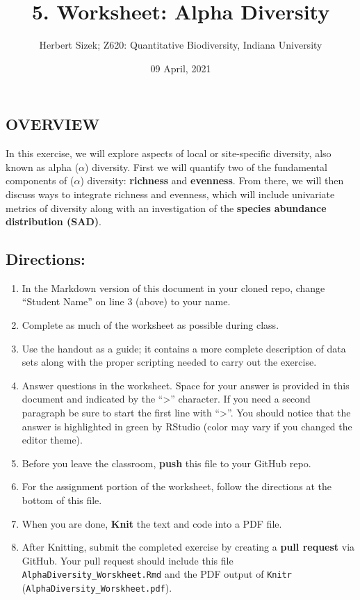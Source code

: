 \documentclass[
]{article}
\title{5. Worksheet: Alpha Diversity}
\author{Herbert Sizek; Z620: Quantitative Biodiversity, Indiana University}
\date{09 April, 2021}
\providecommand{\tightlist}{%
  \setlength{\itemsep}{0pt}\setlength{\parskip}{0pt}}
\begin{document}
\maketitle

\hypertarget{overview}{%
\subsection{OVERVIEW}\label{overview}}

In this exercise, we will explore aspects of local or site-specific
diversity, also known as alpha (\(\alpha\)) diversity. First we will
quantify two of the fundamental components of (\(\alpha\)) diversity:
\textbf{richness} and \textbf{evenness}. From there, we will then
discuss ways to integrate richness and evenness, which will include
univariate metrics of diversity along with an investigation of the
\textbf{species abundance distribution (SAD)}.

\hypertarget{directions}{%
\subsection{Directions:}\label{directions}}

\begin{enumerate}
\def\labelenumi{\arabic{enumi}.}
\tightlist
\item
  In the Markdown version of this document in your cloned repo, change
  ``Student Name'' on line 3 (above) to your name.
\item
  Complete as much of the worksheet as possible during class.
\item
  Use the handout as a guide; it contains a more complete description of
  data sets along with the proper scripting needed to carry out the
  exercise.
\item
  Answer questions in the worksheet. Space for your answer is provided
  in this document and indicated by the ``\textgreater{}'' character. If
  you need a second paragraph be sure to start the first line with
  ``\textgreater{}''. You should notice that the answer is highlighted
  in green by RStudio (color may vary if you changed the editor theme).
\item
  Before you leave the classroom, \textbf{push} this file to your GitHub
  repo.
\item
  For the assignment portion of the worksheet, follow the directions at
  the bottom of this file.
\item
  When you are done, \textbf{Knit} the text and code into a PDF file.
\item
  After Knitting, submit the completed exercise by creating a
  \textbf{pull request} via GitHub. Your pull request should include
  this file \texttt{AlphaDiversity\_Worskheet.Rmd} and the PDF output of
  \texttt{Knitr} (\texttt{AlphaDiversity\_Worskheet.pdf}).
\end{enumerate}
\end{document}
